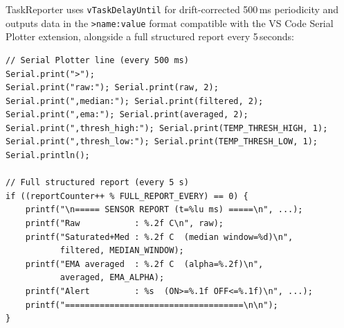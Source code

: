 TaskReporter uses \texttt{vTaskDelayUntil} for drift-corrected 500\,ms periodicity
and outputs data in the \texttt{>name:value} format compatible with the VS Code
Serial Plotter extension, alongside a full structured report every 5\,seconds:
\begin{lstlisting}
// Serial Plotter line (every 500 ms)
Serial.print(">");
Serial.print("raw:"); Serial.print(raw, 2);
Serial.print(",median:"); Serial.print(filtered, 2);
Serial.print(",ema:"); Serial.print(averaged, 2);
Serial.print(",thresh_high:"); Serial.print(TEMP_THRESH_HIGH, 1);
Serial.print(",thresh_low:"); Serial.print(TEMP_THRESH_LOW, 1);
Serial.println();

// Full structured report (every 5 s)
if ((reportCounter++ % FULL_REPORT_EVERY) == 0) {
    printf("\n===== SENSOR REPORT (t=%lu ms) =====\n", ...);
    printf("Raw           : %.2f C\n", raw);
    printf("Saturated+Med : %.2f C  (median window=%d)\n",
           filtered, MEDIAN_WINDOW);
    printf("EMA averaged  : %.2f C  (alpha=%.2f)\n",
           averaged, EMA_ALPHA);
    printf("Alert         : %s  (ON>=%.1f OFF<=%.1f)\n", ...);
    printf("====================================\n\n");
}
\end{lstlisting}
